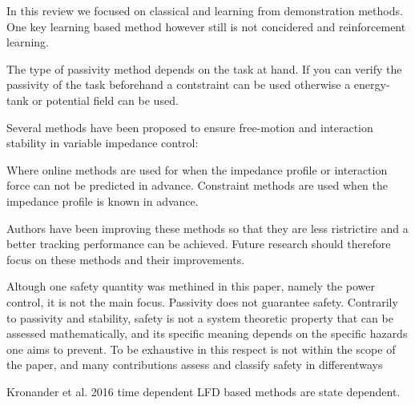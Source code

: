 In this review we focused on classical and learning from demonstration methods. One key learning based method however still is not concidered and reinforcement learning.

The type of passivity method depends on the task at hand. If you can verify the passivity of the task beforehand a contstraint can be used otherwise a energy-tank or potential field can be used.


Several methods have been proposed to ensure free-motion and interaction stability in variable impedance control:

Where online methods are used for when the impedance profile or interaction force can not be predicted in advance. Constraint methods are used when the impedance profile is known in advance.

Authors have been improving these methods so that they are less ristrictire and a better tracking performance can be achieved. Future research should therefore focus on these methods and their improvements. 


Altough one safety quantity was methined in this paper, namely the power control, it is not the main focus.
Passivity does not guarantee safety.
Contrarily to passivity and stability, safety is not a system theoretic property that can be assessed mathematically, and its specific meaning depends on the specific hazards one aims to prevent. To be exhaustive in this respect is not within the scope of the paper, and many contributions assess
and classify safety in differentways

Kronander et al. 2016 time dependent LFD based methods are state dependent.
